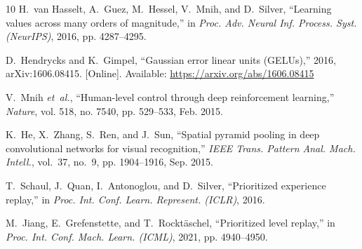 \documentclass[conference]{IEEEtran}
\begin{document}
\begin{thebibliography}{10}
H.~{van Hasselt}, A.~Guez, M.~Hessel, V.~Mnih, and D.~Silver, ``Learning values
  across many orders of magnitude,'' in \emph{Proc. Adv. Neural Inf. Process.
  Syst. ({NeurIPS})}, 2016, pp. 4287--4295.

\BIBentryALTinterwordspacing
D.~Hendrycks and K.~Gimpel, ``Gaussian error linear units ({GELUs}),'' 2016,
  arXiv:1606.08415. [Online]. Available: \url{https://arxiv.org/abs/1606.08415}
\BIBentrySTDinterwordspacing

V.~Mnih \emph{et~al.}, ``Human-level control through deep reinforcement
  learning,'' \emph{Nature}, vol. 518, no. 7540, pp. 529--533, Feb. 2015.

K.~He, X.~Zhang, S.~Ren, and J.~Sun, ``Spatial pyramid pooling in deep
  convolutional networks for visual recognition,'' \emph{{IEEE} Trans. Pattern
  Anal. Mach. Intell.}, vol.~37, no.~9, pp. 1904--1916, Sep. 2015.

T.~Schaul, J.~Quan, I.~Antonoglou, and D.~Silver, ``Prioritized experience
  replay,'' in \emph{Proc. Int. Conf. Learn. Represent. ({ICLR})}, 2016.

M.~Jiang, E.~Grefenstette, and T.~Rockt{\"a}schel, ``Prioritized level
  replay,'' in \emph{Proc. Int. Conf. Mach. Learn. ({ICML})}, 2021, pp.
  4940--4950.

\end{thebibliography}
\end{document}
